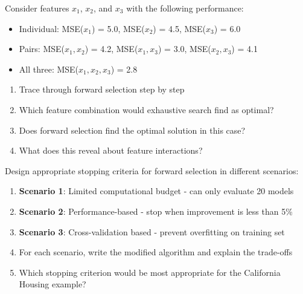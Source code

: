 \documentclass{article}
\newcounter{exercise}
\begin{document}
\begin{tcolorbox}[colback=blue!5!white,colframe=blue!75!black,title=\textbf{Exercise \theexercise: Feature Interaction Effects}]
Consider features $x_1$, $x_2$, and $x_3$ with the following performance:
\begin{itemize}
    \item Individual: MSE($x_1$) = 5.0, MSE($x_2$) = 4.5, MSE($x_3$) = 6.0
    \item Pairs: MSE($x_1, x_2$) = 4.2, MSE($x_1, x_3$) = 3.0, MSE($x_2, x_3$) = 4.1
    \item All three: MSE($x_1, x_2, x_3$) = 2.8
\end{itemize}

\begin{enumerate}[label=(\alph*)]
    \item Trace through forward selection step by step
    \item Which feature combination would exhaustive search find as optimal?
    \item Does forward selection find the optimal solution in this case?
    \item What does this reveal about feature interactions?
\end{enumerate}
\end{tcolorbox}

\begin{tcolorbox}[colback=blue!5!white,colframe=blue!75!black,title=\textbf{Exercise \theexercise: Stopping Criteria Design}]
Design appropriate stopping criteria for forward selection in different scenarios:

\begin{enumerate}[label=(\alph*)]
    \item \textbf{Scenario 1}: Limited computational budget - can only evaluate 20 models
    \item \textbf{Scenario 2}: Performance-based - stop when improvement is less than 5\%
    \item \textbf{Scenario 3}: Cross-validation based - prevent overfitting on training set
    \item For each scenario, write the modified algorithm and explain the trade-offs
    \item Which stopping criterion would be most appropriate for the California Housing example?
\end{enumerate}
\end{tcolorbox}
\end{document}
